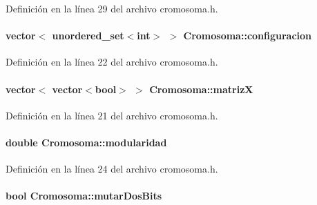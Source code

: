 Definición en la línea 29 del archivo cromosoma.\-h.

\hypertarget{class_cromosoma_aa72923b86f007d67f2ed7801af5b67a0}{
\paragraph[{configuracion}]{\setlength{\rightskip}{0pt plus 5cm}vector$<$ unordered\-\_\-set$<$int$>$ $>$ Cromosoma\-::configuracion\hspace{0.3cm}{\ttfamily [private]}}}\label{class_cromosoma_aa72923b86f007d67f2ed7801af5b67a0}


Definición en la línea 22 del archivo cromosoma.\-h.

\hypertarget{class_cromosoma_a880fe27df3984b070a7b78e325df4508}{
\paragraph[{matriz\-X}]{\setlength{\rightskip}{0pt plus 5cm}vector$<$ vector$<$bool$>$ $>$ Cromosoma\-::matriz\-X\hspace{0.3cm}{\ttfamily [private]}}}\label{class_cromosoma_a880fe27df3984b070a7b78e325df4508}


Definición en la línea 21 del archivo cromosoma.\-h.

\hypertarget{class_cromosoma_a71f2100afa1fc999c31ef6cbd581abb9}{
\paragraph[{modularidad}]{\setlength{\rightskip}{0pt plus 5cm}double Cromosoma\-::modularidad\hspace{0.3cm}{\ttfamily [private]}}}\label{class_cromosoma_a71f2100afa1fc999c31ef6cbd581abb9}


Definición en la línea 24 del archivo cromosoma.\-h.

\hypertarget{class_cromosoma_a4fca54673dbf02d203ba8e106233e333}{
\paragraph[{mutar\-Dos\-Bits}]{\setlength{\rightskip}{0pt plus 5cm}bool Cromosoma\-::mutar\-Dos\-Bits\hspace{0.3cm}{\ttfamily [private]}}}\label{class_cromosoma_a4fca54673dbf02d203ba8e106233e333}


